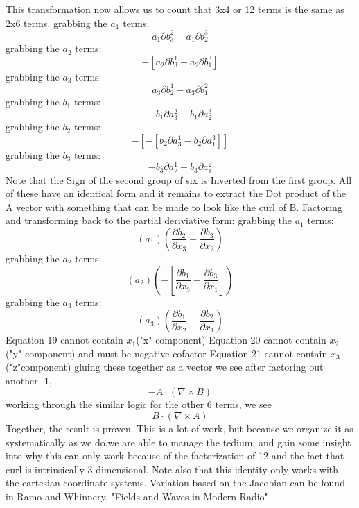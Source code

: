 \documentclass[12pt]{article}
\begin{document}
This transformation now allows us to count that 3x4 or 12 terms is the same as 2x6 terms.
grabbing the $a_1$ terms:
\begin{equation}
a_1\partial b^2_3 -a_1\partial b^3_2 
\end{equation}
grabbing the $a_2$ terms:
\begin{equation}
-\left[a_2\partial b^1_3-a_2\partial b^3_1\right] 
\end{equation}
grabbing the $a_3$ terms:
\begin{equation}
a_3\partial b^1_2   -a_3\partial b^2_1 
\end{equation}
grabbing the $b_1$ terms:
\begin{equation}
-b_1\partial a^2_3 + b_1\partial a^3_2 
\end{equation}
grabbing the $b_2$ terms:
\begin{equation}
-\left[-\left[b_2\partial a^1_3-b_2\partial a^3_1 \right]\right]
\end{equation}
grabbing the $b_3$ terms:
\begin{equation}
-b_3\partial a^1_2   +b_3\partial a^2_1 
\end{equation}
Note that the Sign of the second group of six is Inverted from the first group.
All of these have an identical form and it remains to extract the Dot product of the A vector with something that can be made to look like the curl of B.
Factoring and transforming back to the partial deriviative form:
grabbing the $a_1$ terms:
\begin{equation}
(a_1)(\frac{\partial b_2}{\partial x_3}  -\frac{\partial b_3}{\partial x_2} ) 
\end{equation}
grabbing the $a_2$ terms:
\begin{equation}
(a_2)(-\left[\frac{\partial b_1}{\partial x_3} -\frac{\partial b_3}{\partial x_1}\right]) 
\end{equation}
grabbing the $a_3$ terms:
\begin{equation}
(a_3)(\frac{\partial b_1}{\partial x_2}   -\frac{\partial b_2}{\partial x_1}) 
\end{equation}
Equation 19 cannot contain $x_1$("x" component)
Equation 20 cannot contain $x_2$("y" component) and must be negative cofactor
Equation 21 cannot contain $x_3$("z"component)
gluing these together as a vector we see after factoring out another -1,
\begin{equation}
-A \cdot (\nabla \times B)
\end{equation}
working through the similar logic for the other 6 terms, we see
 \begin{equation}
B \cdot (\nabla \times A)
\end{equation}
Together, the result is proven.
This is a lot of work, but because we organize it as systematically as we do,we are able to manage the tedium, and gain some insight into why this can only work because of the factorization of 12 and the fact that curl is intrinsically 3 dimensional. Note also that this identity only works with the cartesian coordinate systems. Variation based on the Jacobian can be found in Ramo and Whinnery, "Fields and Waves in Modern Radio"\
\end{document}
